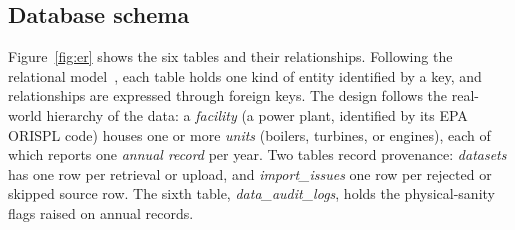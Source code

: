 \documentclass[11pt,a4paper]{article}
\begin{document}
\subsection{Database schema}

Figure~\ref{fig:er} shows the six tables and their relationships. Following the relational
model~\cite{codd1970}, each table holds one kind of entity identified by a key, and
relationships are expressed through foreign keys. The design follows the real-world hierarchy
of the data: a \emph{facility} (a power plant, identified by its EPA ORISPL code) houses one or
more \emph{units} (boilers, turbines, or engines), each of which reports one \emph{annual
record} per year. Two tables record provenance: \emph{datasets} has one row per retrieval or
upload, and \emph{import\_issues} one row per rejected or skipped source row. The sixth table,
\emph{data\_audit\_logs}, holds the physical-sanity flags raised on annual records.
\end{document}
